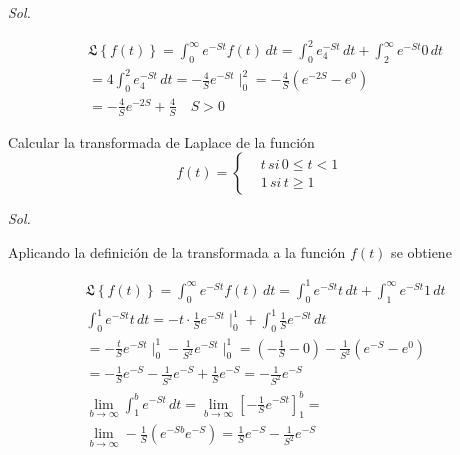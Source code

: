 \textit{ Sol. }

\begin{align*}
    &\mathfrak{L}\left\{f(t)\right\} = \int_0^{\infty}e^{ - St}f(t)\,dt = \int_0^2e^{ - St}_4\,dt +\int_2^{\infty} e^{ - St}0\,dt\\
    &= 4\int_0^2e^{ - St}_4\,dt = - \frac{4}{S}e^{- St}\mid_0^2 = - \frac{4}{S}\left(e^{ - 2S} - e^0\right)\\
    &= - \frac{4}{S}e^{- 2S} + \frac{4}{S}\quad S > 0
\end{align*}

\begin{example}
    Calcular la transformada de Laplace de la función
    \begin{equation*}
        f(t)=\begin{cases}
            &t\,si\, 0\leq t< 1\\ 
            &1\,si\, t\geq 1
        \end{cases}
    \end{equation*}
\end{example}

\textit{ Sol. }

Aplicando la definición de la transformada a la función $f(t)$ se obtiene 

\begin{align*}
    &\mathfrak{L}\left\{f(t)\right\} = \int_0^{\infty}e^{ - St}f(t)\,dt = \int_0^1e^{ - St}t\,dt +\int_1^{\infty} e^{ - St}1\,dt\\
    &\int_0^1 e^{ - St}t\,dt = - t\cdot \frac{1}{S}e^{- St}\mid_0^1 + \int_0^1 \frac{1}{S}e^{ -St}\,dt\\
    &= - \frac{t}{S}e^{ - St}\mid_0^1 - \frac{1}{S^2}e^{ - St}\mid_0^1 = \left(- \frac{1}{S} - 0\right) - \frac{1}{S^2}\left(e^{ - S} - e^0\right)\\
    &=- \frac{1}{S}e^{ - S} - \frac{1}{S^2}e^{ - S} + \frac{1}{S}e^{ - S} =- \frac{1}{S^2}e^{ - S}\\
    &\lim_{b\to \infty}\int_1^b e^{ - St}\,dt =\lim_{b\to \infty} \left[- \frac{1}{S}e^{ - St}\right]_1^b =\\
    &\lim_{b\to \infty} - \frac{1}{S}\left(e^{ - Sb} e^{ - S}\right) = \frac{1}{S}e^{ - S} - \frac{1}{S^2}e^{ - S}\\
\end{align*}

